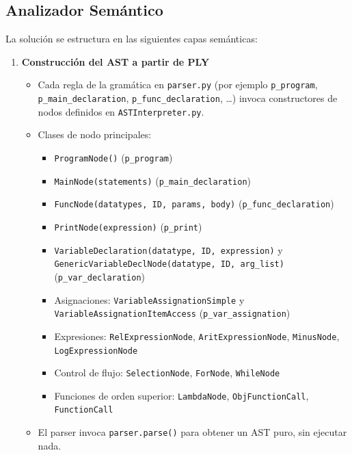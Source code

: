 \documentclass{article}
\begin{document}
\subsection{Analizador Semántico}\label{sec:dis}

La solución se estructura en las siguientes capas semánticas:

\begin{enumerate}
  \item \textbf{Construcción del AST a partir de PLY}  
    \begin{itemize}
      \item Cada regla de la gramática en \texttt{parser.py} (por ejemplo \texttt{p\_program}, \texttt{p\_main\_declaration}, \texttt{p\_func\_declaration}, \ldots) invoca constructores de nodos definidos en \texttt{ASTInterpreter.py}.
      \item Clases de nodo principales:
        \begin{itemize}
          \item \texttt{ProgramNode()} (\texttt{p\_program})
          \item \texttt{MainNode(statements)} (\texttt{p\_main\_declaration})
          \item \texttt{FuncNode(datatypes, ID, params, body)} (\texttt{p\_func\_declaration})
          \item \texttt{PrintNode(expression)} (\texttt{p\_print})
          \item \texttt{VariableDeclaration(datatype, ID, expression)} y \texttt{GenericVariableDeclNode(datatype, ID, arg\_list)} (\texttt{p\_var\_declaration})
          \item Asignaciones: \texttt{VariableAssignationSimple} y \texttt{VariableAssignationItemAccess} (\texttt{p\_var\_assignation})
          \item Expresiones: \texttt{RelExpressionNode}, \texttt{AritExpressionNode}, \texttt{MinusNode}, \texttt{LogExpressionNode}
          \item Control de flujo: \texttt{SelectionNode}, \texttt{ForNode}, \texttt{WhileNode}
          \item Funciones de orden superior: \texttt{LambdaNode}, \texttt{ObjFunctionCall}, \texttt{FunctionCall}
        \end{itemize}
      \item El parser invoca \texttt{parser.parse()} para obtener un AST puro, sin ejecutar nada.
    \end{itemize}


\end{enumerate}
\end{document}

